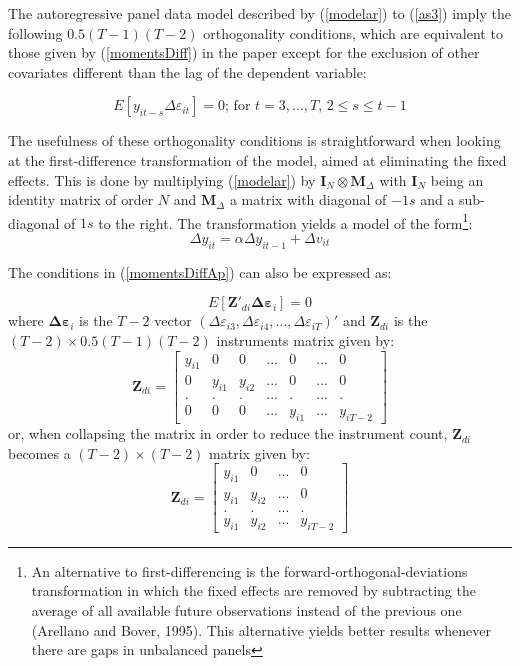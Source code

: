 The autoregressive panel data model described by (\ref{modelar}) to (\ref{as3}) imply the following $0.5(T-1)(T-2)$ orthogonality conditions, which are equivalent to those given by (\ref{momentsDiff}) in the paper except for the exclusion of other covariates different than the lag of the dependent variable:

\begin{equation}
\label{momentsDiffAp}
\tag{5'}
E\left[ y_{it-s}\Delta \varepsilon_{it}\right]=0 \text{; for $t=3,...,T$, $2\leq s \leq t-1$}
\end{equation}

The usefulness of these orthogonality conditions is straightforward when looking at the first-difference transformation of the model, aimed at eliminating the fixed effects. This is done by multiplying (\ref{modelar}) by $\mathbf{I}_N \otimes \mathbf{M}_{\Delta}$ with $\mathbf{I}_N$ being an identity matrix of order $N$ and $\mathbf{M}_{\Delta}$ a matrix with diagonal of $-1s$ and a sub-diagonal of $1s$ to the right. The transformation yields a model of the form\footnote{An alternative to first-differencing is the forward-orthogonal-deviations transformation in which the fixed effects are removed by subtracting the average of all available future observations instead of the previous one (Arellano and Bover, 1995). This alternative yields better results whenever there are gaps in unbalanced panels}:
\[
\Delta y_{it}=\alpha \Delta y_{it-1} +\Delta v_{it}
\]

The conditions in (\ref{momentsDiffAp}) can also be expressed as:

\begin{equation*}
E\left[ \mathbf{Z}'_{di}\mathbf{\Delta \varepsilon}_{i}\right]=0
\end{equation*}
where $\mathbf{\Delta \varepsilon}_{i}$ is the $T-2$ vector $(\Delta \varepsilon_{i3},\Delta \varepsilon_{i4},...,\Delta \varepsilon_{iT})'$ and $\mathbf{Z}_{di}$ is the $(T-2)\times 0.5(T-1)(T-2)$ instruments matrix given by:
\[
\mathbf{Z}_{di} = \left[ {\begin{array}{*{20}{c}}
{{y_{i1}}}&0&0&{...}&0&{...}&0\\
0&{{y_{i1}}}&{{y_{i2}}}&{...}&0&{...}&0\\
.&.&.&{...}&.&{...}&.\\
0&0&0&{...}&{{y_{i1}}}&{...}&{{y_{iT - 2}}}
\end{array}} \right]
\]
or, when collapsing the matrix in order to reduce the instrument count, $\mathbf{Z}_{di}$ becomes a $(T-2)\times (T-2)$ matrix given by:
\[
\mathbf{Z}_{di} = \left[ {\begin{array}{*{20}{c}}
{{y_{i1}}}&0&{...}&0\\
{{y_{i1}}}&{{y_{i2}}}&{...}&0\\
.&.&{...}&.\\
{{y_{i1}}}&{{y_{i2}}}&{...}&{{y_{iT - 2}}}
\end{array}} \right]
\]

